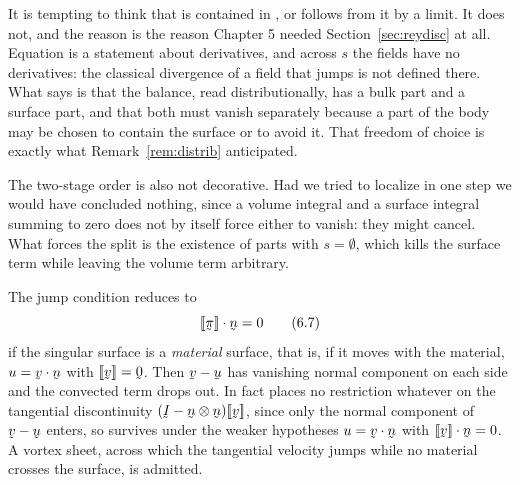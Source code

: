 \begin{remark}\label{rem:ch6two}
It is tempting to think that  is contained in , or
follows from it by a limit. It does not, and the reason is the reason
Chapter 5 needed Section~\ref{sec:reydisc} at all. Equation 
is a statement about derivatives, and across $s$ the fields have no
derivatives: the classical divergence of a field that jumps is not
defined there. What  says is that the balance, read
distributionally, has a bulk part and a surface part, and that both
must vanish separately because a part of the body may be chosen to
contain the surface or to avoid it. That freedom of choice is exactly
what Remark~\ref{rem:distrib} anticipated.

The two-stage order is also not decorative. Had we tried to localize
 in one step we would have concluded nothing, since a volume
integral and a surface integral summing to zero does not by itself
force either to vanish: they might cancel. What forces the split is the
existence of parts with $s=\emptyset$, which kills the surface term
while leaving the volume term arbitrary.
\end{remark}

The jump condition  reduces to
\begin{equation}
   \ip{\jump{\vek{\pi}}}\bn=0
   \tag{6.7}\label{eq:6.7}
\end{equation}
if the singular surface is a \emph{material} surface, that is, if it
moves with the material, $u=\ip\bv\bn$ with $\jump\bv=\bze$. Then
$\bv-\bu$ has vanishing normal component on each side and the convected
term drops out. In fact  places no restriction whatever on the
tangential discontinuity $(\I-\bn\otimes\bn)\jump\bv$, since only the
normal component of $\bv-\bu$ enters, so  survives under the
weaker hypotheses $u=\ip\bv\bn$ with $\ip{\jump\bv}\bn=0$. A vortex
sheet, across which the tangential velocity jumps while no material
crosses the surface, is admitted.

